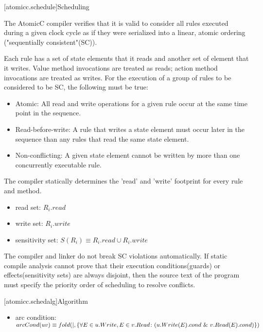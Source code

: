 [atomicc.schedule]{Scheduling}

The AtomicC compiler verifies that it is valid to consider
all rules executed during a given clock cycle
as if they were serialized into a linear, atomic ordering ("sequentially consistent"(SC)).

Each rule has a set of state elements that it reads and another set of element that it writes.
Value method invocations are treated as reads; action method invocations are treated as writes.
For the execution of a group of rules to be considered to be SC, the following must
be true:
\begin{itemize}
\item Atomic: All read and write operations for a given rule occur at the same time point in the sequence.
\item Read-before-write:  A rule that writes a state element must occur later in the sequence
than any rules that read the same state element.
\item Non-conflicting: A given state element cannot be written by more than one concurrently executable rule.
\end{itemize}

The compiler statically determines the 'read' and 'write'
footprint for every rule and method.
\begin{itemize}
\item read set: $R_{i}.read$
\item write set: $R_{i}.write$
\item sensitivity set: $S(R_{i}) \equiv R_{i}.read \cup R_{i}.write$
\end{itemize}

The compiler and linker do not break SC violations automatically.
If static compile analysis cannot prove that their execution conditions(guards) or
effects(sensitivity sets) are always disjoint,
then the source text of the program must specify the priority order of scheduling
to resolve conflicts.

[atomicc.schedalg]{Algorithm}
\begin{itemize}
\item arc condition: $arcCond(uv) \equiv
\newline
      fold (|, \{ \forall E \in u.Write, E \in v.Read \colon (u.Write(E).cond\ \&\ v.Read(E).cond) \})$
\end{itemize}

